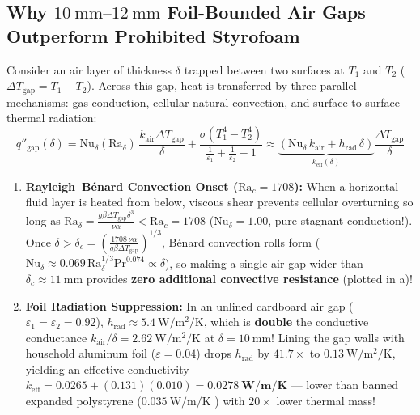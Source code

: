 \subsection{Why $\SIrange{10}{12}{\milli\meter}$ Foil-Bounded Air Gaps Outperform Prohibited Styrofoam}
Consider an air layer of thickness $\delta$ trapped between two surfaces at $T_1$ and $T_2$ ($\Delta T_{\mathrm{gap}} = T_1 - T_2$). Across this gap, heat is transferred by three parallel mechanisms: gas conduction, cellular natural convection, and surface-to-surface thermal radiation:
\begin{equation}
  q''_{\mathrm{gap}}(\delta) = \mathrm{Nu}_\delta(\mathrm{Ra}_\delta)\,\frac{k_{\mathrm{air}}\Delta T_{\mathrm{gap}}}{\delta} + \frac{\sigma(T_1^4 - T_2^4)}{\frac{1}{\varepsilon_1} + \frac{1}{\varepsilon_2} - 1} \approx \underbrace{\left(\mathrm{Nu}_\delta\,k_{\mathrm{air}} + h_{\mathrm{rad}}\,\delta\right)}_{k_{\mathrm{eff}}(\delta)}\frac{\Delta T_{\mathrm{gap}}}{\delta}
  \label{eq:11:air-gap-flux}
\end{equation}
\begin{enumerate}
  \item \textbf{Rayleigh--B\'enard Convection Onset ($\mathrm{Ra}_c = 1708$):} When a horizontal fluid layer is heated from below, viscous shear prevents cellular overturning so long as $\mathrm{Ra}_\delta = \frac{g\beta\Delta T_{\mathrm{gap}}\delta^3}{\nu\alpha} < \mathrm{Ra}_c = 1708$ ($\mathrm{Nu}_\delta = 1.00$, pure stagnant conduction!). Once $\delta > \delta_c = \left(\frac{1708\,\nu\alpha}{g\beta\Delta T_{\mathrm{gap}}}\right)^{1/3}$, B\'enard convection rolls form ($\mathrm{Nu}_\delta \approx 0.069\,\mathrm{Ra}_\delta^{1/3}\mathrm{Pr}^{0.074} \propto \delta$), so making a single air gap wider than $\delta_c \approx \SI{11}{\milli\meter}$ provides \textbf{zero additional convective resistance} (plotted in a)!
  \item \textbf{Foil Radiation Suppression:} In an unlined cardboard air gap ($\varepsilon_1 = \varepsilon_2 = 0.92$), $h_{\mathrm{rad}} \approx \SI{5.4}{\watt\per\square\meter\per\kelvin}$, which is \textbf{double} the conductive conductance $k_{\mathrm{air}}/\delta = \SI{2.62}{\watt\per\square\meter\per\kelvin}$ at $\delta = \SI{10}{\milli\meter}$! Lining the gap walls with household aluminum foil ($\varepsilon = 0.04$) drops $h_{\mathrm{rad}}$ by $41.7\times$ to $\SI{0.13}{\watt\per\square\meter\per\kelvin}$, yielding an effective conductivity $k_{\mathrm{eff}} = 0.0265 + (0.131)(0.010) = \mathbf{\SI{0.0278}{\watt\per\meter\per\kelvin}}$ — lower than banned expanded polystyrene ($\SI{0.035}{\watt\per\meter\per\kelvin}$ ) with $20\times$ lower thermal mass!
\end{enumerate}

